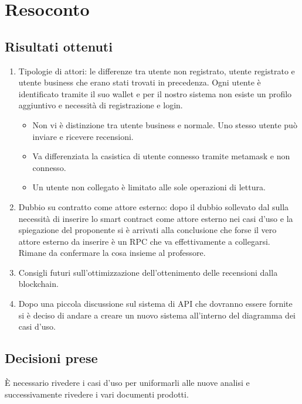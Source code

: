 \section{Resoconto}

\subsection{Risultati ottenuti}

\begin{enumerate}
    \item Tipologie di attori: le differenze tra utente non registrato, utente registrato e utente business che erano stati trovati in precedenza. Ogni utente è identificato tramite il suo wallet e per il nostro sistema non esiste un profilo aggiuntivo e necessità di registrazione e login.
    \begin{itemize}
        \item Non vi è distinzione tra utente business e normale. Uno stesso utente può inviare e ricevere recensioni.
        \item Va differenziata la casistica di utente connesso tramite metamask e non connesso.
        \item Un utente non collegato è limitato alle sole operazioni di lettura.
    \end{itemize}
    \item Dubbio su contratto come attore esterno: dopo il dubbio sollevato dal \cardin sulla necessità di inserire lo smart contract come attore esterno nei casi d'uso e la spiegazione del proponente si è arrivati alla conclusione che forse il vero attore esterno da inserire è un RPC che va effettivamente a collegarsi. Rimane da confermare la cosa insieme al professore.
    \item Consigli futuri sull'ottimizzazione dell'ottenimento delle recensioni dalla blockchain.
    \item Dopo una piccola discussione sul sistema di API che dovranno essere fornite si è deciso di andare a creare un nuovo sistema all'interno del diagramma dei casi d'uso.  
\end{enumerate}

\subsection{Decisioni prese}
È necessario rivedere i casi d'uso per uniformarli alle nuove analisi e successivamente rivedere i vari documenti prodotti.